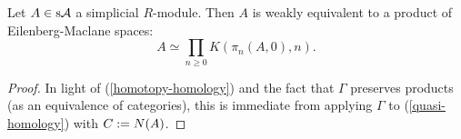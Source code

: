 \begin{proposition}
  Let $A \in \mathrm{s}\mathcal{A}$ a simplicial $R$-module. Then $A$ is weakly
  equivalent to a product of Eilenberg-Maclane spaces:
  \[
  A \simeq \prod_{n \ge 0} K(\pi_n(A,0),n).
  \]
\end{proposition}

\begin{proof}
  In light of (\ref{homotopy-homology}) and the fact that $\Gamma$
  preserves products (as an equivalence of categories), this is
  immediate from applying $\Gamma$ to (\ref{quasi-homology}) with $C
  \mathrel{:=} N(A)$.
\end{proof}


\nocite{goerssjardine, riehl-ssets, mathew-doldkan, weibel}




